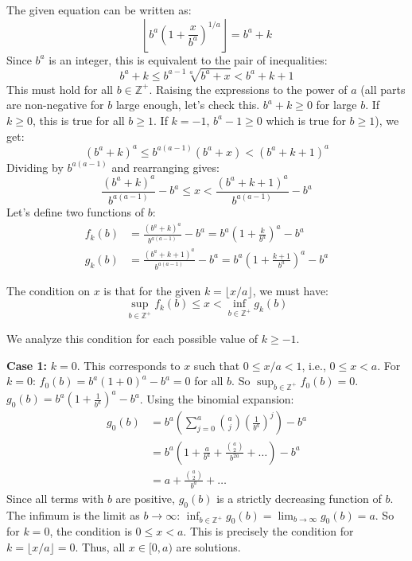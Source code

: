 \documentclass[12pt,a4paper]{article}
\theoremstyle{definition}
\begin{document}
        The given equation can be written as:
        \[ \left\lfloor b^a \left(1 + \frac{x}{b^a}\right)^{1/a} \right\rfloor = b^a + k \]
        Since $b^a$ is an integer, this is equivalent to the pair of inequalities:
        \[ b^a + k \leq b^{a-1} \sqrt[a]{b^a + x} < b^a + k + 1 \]
        This must hold for all $b \in \mathbb{Z}^+$.
        Raising the expressions to the power of $a$ (all parts are non-negative for $b$ large enough, let's check this. $b^a+k \geq 0$ for large $b$. If $k \geq 0$, this is true for all $b\geq 1$. If $k=-1$, $b^a-1 \geq 0$ which is true for $b \geq 1$), we get:
        \[ (b^a + k)^a \leq b^{a(a-1)} (b^a + x) < (b^a + k + 1)^a \]
        Dividing by $b^{a(a-1)}$ and rearranging gives:
        \[ \frac{(b^a+k)^a}{b^{a(a-1)}} - b^a \leq x < \frac{(b^a+k+1)^a}{b^{a(a-1)}} - b^a \]
        Let's define two functions of $b$:
        \begin{align}
            f_k(b) &= \frac{(b^a+k)^a}{b^{a(a-1)}} - b^a = b^a\left(1+\frac{k}{b^a}\right)^a - b^a\\
            g_k(b) &= \frac{(b^a+k+1)^a}{b^{a(a-1)}} - b^a = b^a\left(1+\frac{k+1}{b^a}\right)^a - b^a
        \end{align}

        The condition on $x$ is that for the given $k=\lfloor x/a \rfloor$, we must have:
        \[ \sup_{b \in \mathbb{Z}^+} f_k(b) \leq x < \inf_{b \in \mathbb{Z}^+} g_k(b) \]

        We analyze this condition for each possible value of $k \geq -1$.

        \textbf{Case 1:} $k = 0$.
        This corresponds to $x$ such that $0 \leq x/a < 1$, i.e., $0 \leq x < a$.
        For $k=0$:
        $f_0(b) = b^a(1+0)^a - b^a = 0$ for all $b$. So $\sup_{b \in \mathbb{Z}^+} f_0(b) = 0$.
        $g_0(b) = b^a\left(1+\frac{1}{b^a}\right)^a - b^a$. Using the binomial expansion:
        \begin{align}
            g_0(b) &= b^a\left(\sum_{j=0}^a \binom{a}{j} \left(\frac{1}{b^a}\right)^j\right) - b^a \\
            &= b^a\left(1 + \frac{a}{b^a} + \frac{\binom{a}{2}}{b^{2a}} + \ldots\right) - b^a \\
            &= a + \frac{\binom{a}{2}}{b^a} + \ldots
        \end{align}
        Since all terms with $b$ are positive, $g_0(b)$ is a strictly decreasing function of $b$.
        The infimum is the limit as $b \to \infty$: $\inf_{b \in \mathbb{Z}^+} g_0(b) = \lim_{b \to \infty} g_0(b) = a$.
        So for $k=0$, the condition is $0 \leq x < a$. This is precisely the condition for $k=\lfloor x/a \rfloor=0$.
        Thus, all $x \in [0, a)$ are solutions.
\end{document}
